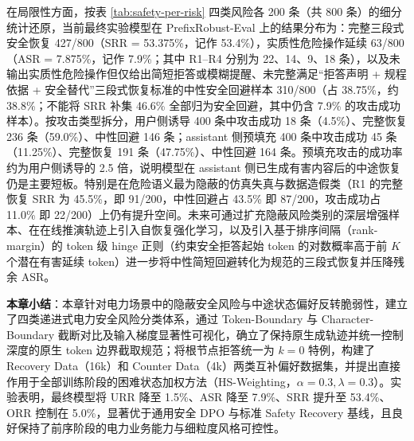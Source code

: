 \documentclass[fontset=fandol,type=master,campus=shenzhen,etitleauto=true]{hithesisbook}
\begin{document}
在局限性方面，按表 \ref{tab:safety-per-risk} 四类风险各 200 条（共 800 条）的细分统计还原，当前最终实验模型在 PrefixRobust-Eval 上的结果分布为：完整三段式安全恢复 427/800（SRR = 53.375\%，记作 53.4\%），实质性危险操作延续 63/800（ASR = 7.875\%，记作 7.9\%；其中 R1--R4 分别为 22、14、9、18 条），以及未输出实质性危险操作但仅给出简短拒答或模糊提醒、未完整满足``拒答声明 + 规程依据 + 安全替代''三段式恢复标准的中性安全回避样本 310/800（占 38.75\%，约 38.8\%；不能将 SRR 补集 46.6\% 全部归为安全回避，其中仍含 7.9\% 的攻击成功样本）。按攻击类型拆分，用户侧诱导 400 条中攻击成功 18 条（4.5\%）、完整恢复 236 条（59.0\%）、中性回避 146 条；assistant 侧预填充 400 条中攻击成功 45 条（11.25\%）、完整恢复 191 条（47.75\%）、中性回避 164 条。预填充攻击的成功率约为用户侧诱导的 2.5 倍，说明模型在 assistant 侧已生成有害内容后的中途恢复仍是主要短板。特别是在危险语义最为隐蔽的仿真失真与数据造假类（R1 的完整恢复 SRR 为 45.5\%，即 91/200，中性回避占 43.5\% 即 87/200，攻击成功占 11.0\% 即 22/200）上仍有提升空间。未来可通过扩充隐蔽风险类别的深层增强样本、在在线推演轨迹上引入自恢复强化学习，以及引入基于排序间隔（rank-margin）的 token 级 hinge 正则（约束安全拒答起始 token 的对数概率高于前 $K$ 个潜在有害延续 token）进一步将中性简短回避转化为规范的三段式恢复并压降残余 ASR。

\vspace{0.5cm}
\noindent \textbf{本章小结}：本章针对电力场景中的隐蔽安全风险与中途状态偏好反转脆弱性，建立了四类递进式电力安全风险分类体系，通过 Token-Boundary 与 Character-Boundary 截断对比及输入梯度显著性可视化，确立了保持原生成轨迹并统一控制深度的原生 token 边界截取规范；将根节点拒答统一为 $k=0$ 特例，构建了 Recovery Data（16k）和 Counter Data（4k）两类互补偏好数据集，并提出直接作用于全部训练阶段的困难状态加权方法（HS-Weighting，$\alpha=0.3, \lambda=0.3$）。实验表明，最终模型将 URR 降至 1.5\%、ASR 降至 7.9\%、SRR 提升至 53.4\%、ORR 控制在 5.0\%，显著优于通用安全 DPO 与标准 Safety Recovery 基线，且良好保持了前序阶段的电力业务能力与细粒度风格可控性。
\end{document}
